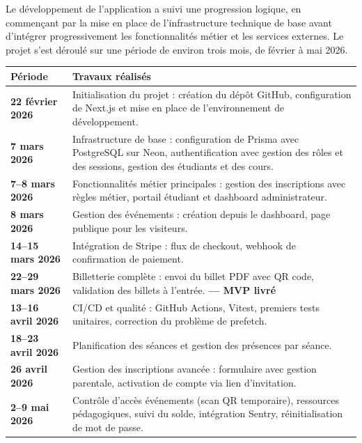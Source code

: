 \documentclass{article}
\begin{document}
Le développement de l'application a suivi une progression logique,
en commençant par la mise en place de l'infrastructure technique de
base avant d'intégrer progressivement les fonctionnalités métier et
les services externes. Le projet s'est déroulé sur une période de
environ trois mois, de février à mai 2026.

\begin{table}[H]
\centering
\renewcommand{\arraystretch}{1.4}
\begin{tabular}{>{\bfseries}p{3.5cm} p{10cm}}
\toprule
\textbf{Période} & \textbf{Travaux réalisés} \\
\midrule
22 février 2026 & 
Initialisation du projet : création du dépôt GitHub, 
configuration de Next.js et mise en place de l'environnement 
de développement. \\

7 mars 2026 & 
Infrastructure de base : configuration de Prisma avec PostgreSQL 
sur Neon, authentification avec gestion des rôles et des sessions, 
gestion des étudiants et des cours. \\

7--8 mars 2026 & 
Fonctionnalités métier principales : gestion des inscriptions 
avec règles métier, portail étudiant et dashboard administrateur. \\

8 mars 2026 & 
Gestion des événements : création depuis le dashboard, 
page publique pour les visiteurs. \\

14--15 mars 2026 & 
Intégration de Stripe : flux de checkout, webhook de 
confirmation de paiement. \\

22--29 mars 2026 & 
Billetterie complète : envoi du billet PDF avec QR code, 
validation des billets à l'entrée. \textbf{— MVP livré} \\

13--16 avril 2026 & 
CI/CD et qualité : GitHub Actions, Vitest, premiers tests 
unitaires, correction du problème de prefetch. \\

18--23 avril 2026 & 
Planification des séances et gestion des présences par séance. \\

26 avril 2026 & 
Gestion des inscriptions avancée : formulaire avec gestion 
parentale, activation de compte via lien d'invitation. \\

2--9 mai 2026 & 
Contrôle d'accès événements (scan QR temporaire), ressources 
pédagogiques, suivi du solde, intégration Sentry, 
réinitialisation de mot de passe. \\


\end{tabular}
\end{table}
\end{document}
